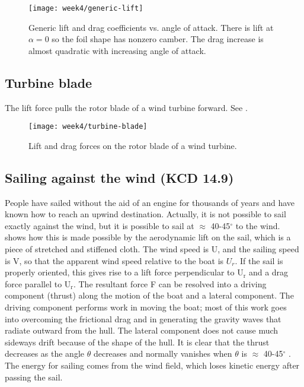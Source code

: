 \begin{figure}[!h]
    \centering
    \texttt{[image: week4/generic-lift]}\\
    \caption{Generic lift and drag coefficients vs. angle of attack. There is lift at $\alpha=0$ so the foil shape has nonzero camber. The drag increase is almost quadratic with increasing angle of attack.}
    \label{fig:generic-lift}
\end{figure}


\subsection{Turbine blade}
The lift force pulls the rotor blade of a wind turbine forward. See .
\begin{figure}[!h]
    \centering
    \texttt{[image: week4/turbine-blade]}\\
    \caption{Lift and drag forces on the rotor blade of a wind turbine.}
    \label{fig:turbine-blade}
\end{figure}


\subsection[Sailing against the wind]{Sailing against the wind (KCD 14.9)}
People have sailed without the aid of an engine for thousands of years and have known
how to reach an upwind destination. Actually, it is not possible to sail exactly against the
wind, but it is possible to sail at $\approx$ 40-45$^\circ$ to the wind.  shows
how this is made possible by the aerodynamic lift on the sail, which is a piece of stretched and stiffened
cloth. The wind speed is U, and the sailing speed is V, so that the apparent wind speed relative
to the boat is $U_r$. If the sail is properly oriented, this gives rise to a lift force perpendicular
to U$_\text{r}$ and a drag force parallel to U$_\text{r}$. The resultant force F can be resolved into a driving
component (thrust) along the motion of the boat and a lateral component. The driving
component performs work in moving the boat; most of this work goes into overcoming
the frictional drag and in generating the gravity waves that radiate outward from the hull.
The lateral component does not cause much sideways drift because of the shape of the
hull. It is clear that the thrust decreases as the angle $\theta$ decreases and normally vanishes
when $\theta$ is $\approx$ 40-45$^\circ$ . The energy for sailing comes from the wind field, which loses kinetic
energy after passing the sail.

